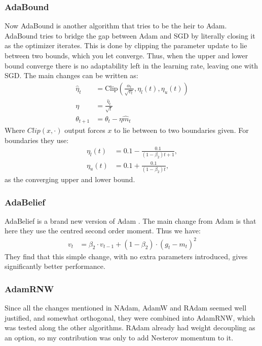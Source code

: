 \subsubsection{AdaBound}
Now AdaBound \cite{luoAdaptiveGradientMethods2018} is another algorithm that tries to be the heir to \ac{Adam}. 
AdaBound tries to bridge the gap between \ac{Adam} and \ac{SGD} by literally closing it as the optimizer iterates.
This is done by clipping the parameter update to lie between two bounds, which you let converge.
Thus, when the upper and lower bound converge there is no adaptability left in the learning rate, leaving one with \ac{SGD}.
The main changes can be written as:
\begin{align}
	\hat{\eta}_t &= \text{Clip}(\frac{\alpha_t}{\sqrt{v_t}},\eta_l(t), \eta_u(t) ) \\
	\eta &= \frac{\hat{\eta}_t}{\sqrt{t}} \\
	\theta_{t+1} &=\theta_{t} - \eta \hat{m}_t
\end{align}
Where $Clip(x, \cdot)$ output forces $x$ to lie between to two boundaries given. For boundaries they use:
\begin{align}
	\eta_l(t) &= 0.1 - \frac{0.1}{(1-\beta_{2})t+1},\\
	\eta_u(t) &= 0.1 + \frac{0.1}{(1-\beta_{2})t},
\end{align}
as the converging upper and lower bound.
\subsubsection{AdaBelief}
AdaBelief is a brand new version of \ac{Adam} \cite{zhuangAdaBeliefOptimizerAdapting2020}. The main change from \ac{Adam} is that here they use the centred second order moment. Thus we have:
\begin{align}
	v_t &= \beta_2 \cdot v_{t-1} + (1-\beta_2) \cdot (g_{t} - m_t)^2
\end{align}
They find that this simple change, with no extra parameters introduced, gives significantly better performance.

\subsubsection{AdamRNW}
\label{sec:adamrnw}
Since all the changes mentioned in NAdam, AdamW and RAdam seemed well justified, and somewhat orthogonal, they were combined into AdamRNW, which was tested along the other algorithms.
RAdam already had weight decoupling as an option, so my contribution was only to add Nesterov momentum to it. 
